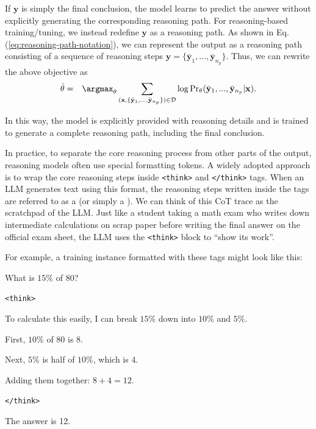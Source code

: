 If $\mathbf{y}$ is simply the final conclusion, the model learns to predict the answer without explicitly generating the corresponding reasoning path. For reasoning-based training/tuning, we instead redefine $\mathbf{y}$ as a reasoning path. As shown in Eq. (\ref{eq:reasoning-path-notation}), we can represent the output as a reasoning path consisting of a sequence of reasoning steps $\mathbf{y} = \{\bar{\mathbf{y}}_1,...,\bar{\mathbf{y}}_{n_p}\}$. Thus, we can rewrite the above objective as
\begin{eqnarray}
\hat{\theta} & = & \argmax_{\theta} \sum_{(\mathbf{x}, \{\bar{\mathbf{y}}_1,...,\bar{\mathbf{y}}_{n_p}\}) \in \mathcal{D}} \log \mathrm{Pr}_{\theta} (\bar{\mathbf{y}}_1,...,\bar{\mathbf{y}}_{n_p}|\mathbf{x}).
\end{eqnarray}

\noindent In this way, the model is explicitly provided with reasoning details and is trained to generate a complete reasoning path, including the final conclusion.

In practice, to separate the core reasoning process from other parts of the output, reasoning models often use special formatting tokens. A widely adopted approach is to wrap the core reasoning steps inside \texttt{<think>} and \texttt{</think>} tags. When an LLM generates text using this format, the reasoning steps written inside the tags are referred to as a  (or simply a ). We can think of this CoT trace as the scratchpad of the LLM. Just like a student taking a math exam who writes down intermediate calculations on scrap paper before writing the final answer on the official exam sheet, the LLM uses the \texttt{<think>} block to ``show its work''.

For example, a training instance formatted with these tags might look like this:

\vspace{0.5em}
\begin{tcolorbox}
\begingroup
\setlength{\leftskip}{2em}
\setlength{\rightskip}{2em}

What is $15\%$ of $80$?

\vspace{0.3em}

\texttt{<think>}

To calculate this easily, I can break $15\%$ down into $10\%$ and $5\%$.

First, $10\%$ of $80$ is $8$.

Next, $5\%$ is half of $10\%$, which is $4$.

Adding them together: $8 + 4 = 12$.

\texttt{</think>}

The answer is 12.

\endgroup
\end{tcolorbox}
\vspace{0.5em}

